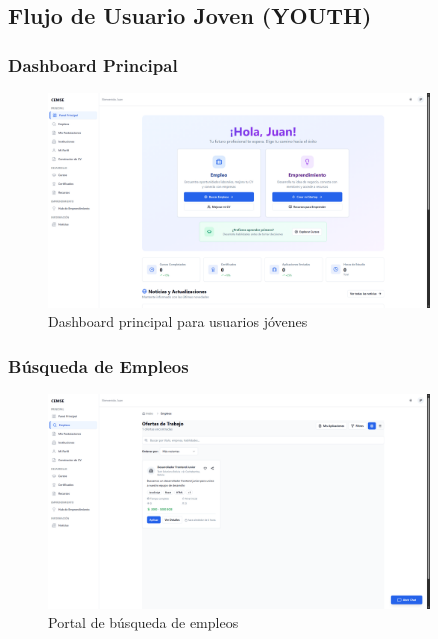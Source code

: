 \documentclass[12pt,a4paper]{article}
\begin{document}
\begin{enumerate}
\subsection{Flujo de Usuario Joven (YOUTH)}

\subsubsection{Dashboard Principal}
\begin{figure}[H]
    \centering
    \includegraphics[width=0.9\textwidth]{screenshots/youth/dashboard.png}
    \caption{Dashboard principal para usuarios jóvenes}
    \label{fig:youth-dashboard}
\end{figure}

\subsubsection{Búsqueda de Empleos}
\begin{figure}[H]
    \centering
    \includegraphics[width=0.9\textwidth]{screenshots/youth/jobs-search.png}
    \caption{Portal de búsqueda de empleos}
    \label{fig:youth-jobs}
\end{figure}


\end{enumerate}
\end{document}
